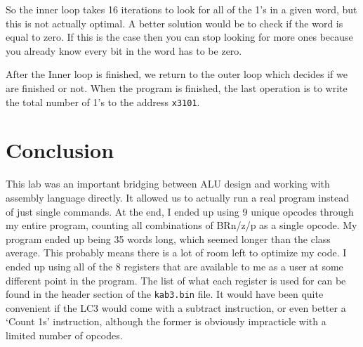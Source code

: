 \documentclass[a4paper,11pt]{article}
\begin{document}
So the inner loop takes 16 iterations to look for all of the 1's in a given word, but this is not actually optimal. A better solution would be to check if the word is equal to zero. If this is the case then you can stop looking for more ones because you already know every bit in the word has to be zero. 

After the Inner loop is finished, we return to the outer loop which decides if we are finished or not. When the program is finished, the last operation is to write the total number of 1's to the address \texttt{x3101}. 


\section{Conclusion}
This lab was an important bridging between ALU design and working with assembly language directly. It allowed us to actually run a real program instead of just single commands. At the end, I ended up using 9 unique opcodes through my entire program, counting all combinations of BRn/z/p as a single opcode. My program ended up being 35 words long, which seemed longer than the class average. This probably means there is a lot of room left to optimize my code. I ended up using all of the 8 registers that are available to me as a user at some different point in the program. The list of what each register is used for can be found in the header section of the \texttt{kab3.bin} file. It would have been quite convenient if the LC3 would come with a subtract instruction, or even better a `Count 1s' instruction, although the former is obviously impracticle with a limited number of opcodes. 
\end{document}
